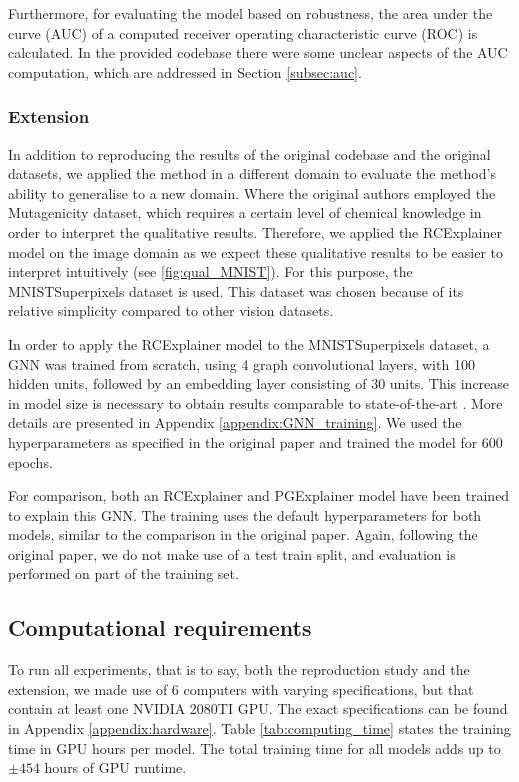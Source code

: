 Furthermore, for evaluating the model based on robustness, the area under the curve (AUC) of a computed receiver operating characteristic curve (ROC) is calculated. In the provided codebase there were some unclear aspects of the AUC computation, which are addressed in Section \ref{subsec:auc}.


\subsubsection{Extension}
\label{section:extension}
In addition to reproducing the results of the original codebase and the original datasets, we applied the method in a different domain to evaluate the method's ability to generalise to a new domain. Where the original authors employed the Mutagenicity dataset, which requires a certain level of chemical knowledge in order to interpret the qualitative results. Therefore, we applied the RCExplainer model on the image domain as we expect these qualitative results to be easier to interpret intuitively (see \ref{fig:qual_MNIST}). For this purpose, the MNISTSuperpixels dataset  \cite{monti2016geometric} is used. This dataset was chosen because of its relative simplicity compared to other vision datasets.

In order to apply the RCExplainer model to the MNISTSuperpixels dataset, a GNN was trained from scratch, using 4 graph convolutional layers, with 100 hidden units, followed by an embedding layer consisting of 30 units. This increase in model size is necessary to obtain results comparable to state-of-the-art \cite{dwivedi2020benchmarking}. More details are presented in Appendix \ref{appendix:GNN_training}. We used the hyperparameters as specified in the original paper and trained the model for 600 epochs. 

For comparison, both an RCExplainer and PGExplainer model have been trained to explain this GNN. The training uses the default hyperparameters for both models, similar to the comparison in the original paper. Again, following the original paper, we do not make use of a test train split, and evaluation is performed on part of the training set.

\subsection{Computational requirements}
To run all experiments, that is to say, both the reproduction study and the extension, we made use of 6 computers with varying specifications, but that contain at least one NVIDIA 2080TI GPU. The exact specifications can be found in Appendix \ref{appendix:hardware}. Table \ref{tab:computing_time} states the training time in GPU hours per model. The total training time for all models adds up to $\pm 454$ hours of GPU runtime.

